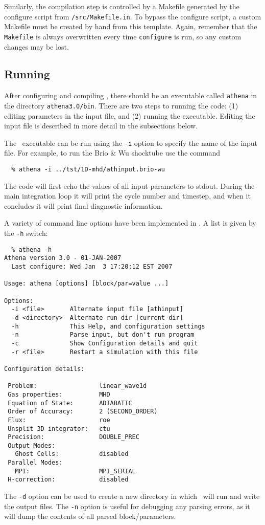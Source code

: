 Similarly, the compilation step is controlled by a Makefile generated by
the configure script from {\tt /src/Makefile.in}.  To bypass the configure
script, a custom Makefile must be created by hand from this template.
Again, remember that the {\tt Makefile} is always
overwritten every time {\tt configure} is run, so any custom changes may be
lost.

\subsection{Running \ath}

After configuring and compiling \ath, there should be an executable
called {\tt athena} in the directory {\tt athena3.0/bin}.  There
are two steps to running the code: (1) editing parameters in the
input file, and (2) running the executable.  Editing the input file is 
described in more detail in the subsections below.

The \ath\ executable can be run using the {\tt -i} option to specify the name of
the input file.  For example, to run the Brio \& Wu shocktube use
the command
\begin{verbatim}
  % athena -i ../tst/1D-mhd/athinput.brio-wu
\end{verbatim}
The code will first echo the values of all input parameters to stdout.
During the main integration loop
it will print the cycle number and timestep, and
when it concludes it will print final diagnostic information.

A variety of command line options have been implemented in \ath.
A list is given by the {\tt -h} switch:
\begin{verbatim}
  % athena -h
Athena version 3.0 - 01-JAN-2007
  Last configure: Wed Jan  3 17:20:12 EST 2007

Usage: athena [options] [block/par=value ...]

Options:
  -i <file>       Alternate input file [athinput]
  -d <directory>  Alternate run dir [current dir]
  -h              This Help, and configuration settings
  -n              Parse input, but don't run program
  -c              Show Configuration details and quit
  -r <file>       Restart a simulation with this file

Configuration details:

 Problem:                 linear_wave1d
 Gas properties:          MHD
 Equation of State:       ADIABATIC
 Order of Accuracy:       2 (SECOND_ORDER)
 Flux:                    roe
 Unsplit 3D integrator:   ctu
 Precision:               DOUBLE_PREC
 Output Modes:
   Ghost Cells:           disabled
 Parallel Modes:
   MPI:                   MPI_SERIAL
 H-correction:            disabled
\end{verbatim}
The {\tt -d} option can be used to create a new directory in which
\ath\ will run and write the output files.  The {\tt -n} option is
useful for debugging any parsing errors, as it will dump the contents
of all parsed block/parameters.

